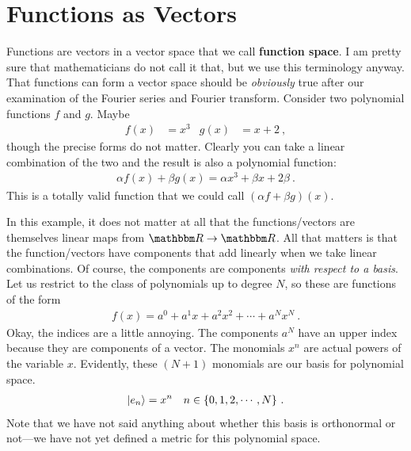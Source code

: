 \documentclass[12pt, oneside]{report}    %
\let\oldsection\section
\def\section{%
  \setcounter{sidenote}{1}%
  \oldsection
}
\begin{document}
\section{Functions as Vectors}

Functions are vectors in a vector space that we call \textbf{function space}. I am pretty sure that mathematicians do not call it that, but we use this terminology anyway. That functions can form a vector space should be \emph{obviously} true after our examination of the Fourier series and Fourier transform. Consider two polynomial functions $f$ and $g$. Maybe
\begin{align}
  f(x) &= x^3  
  &
  g(x) &= x + 2 \ ,
\end{align}
though the precise forms do not matter. Clearly you can take a linear combination of the two and the result is also a polynomial function:
\begin{align}
  \alpha f(x) + \beta g(x) = \alpha x^3 + \beta x + 2\beta \ .
\end{align}
This is a totally valid function that we could call $(\alpha f + \beta g)(x)$. 

In this example, it does not matter at all that the functions/vectors are themselves linear maps from $\RR \to \RR$. All that matters is that the function/vectors have components that add linearly when we take linear combinations. Of course, the components are components \emph{with respect to a basis}. Let us restrict to the class of polynomials up to degree $N$, so these are functions of the form
\begin{align}
    f(x) = a^0 + a^1 x + a^2 x^2 + \cdots + a^N x^N \ .
\end{align}
Okay, the indices are a little annoying. The components $a^N$ have an upper index because they are components of a vector. The monomials $x^n$ are actual powers of the variable $x$. Evidently, these $(N+1)$ monomials are our basis for polynomial space. 
\begin{align}
    \left|e_n\right\rangle &= x^n
    &
    n \in \{0, 1, 2, \cdots, N\} \ .
    \label{eq:polynomial:basis}
\end{align}
Note that we have not said anything about whether this basis is orthonormal or not---we have not yet defined a metric for this polynomial space. 
\end{document}
